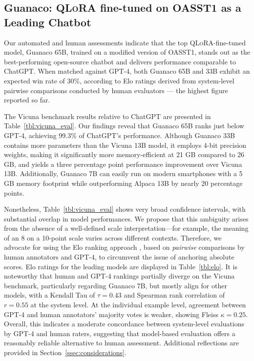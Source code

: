 \subsection{\textbf{Guanaco}: \textsc{QLoRA} fine-tuned on OASST1 as a Leading Chatbot} Our automated and human assessments indicate that the top \textsc{QLoRA}-fine-tuned model, {Guanaco} 65B, trained on a modified version of OASST1, stands out as the best-performing open-source chatbot and delivers performance comparable to ChatGPT. When matched against GPT-4, both {Guanaco} 65B and 33B exhibit an expected win rate of 30\%, according to Elo ratings derived from system-level pairwise comparisons conducted by human evaluators — the highest figure reported so far.

The Vicuna benchmark \cite{vicuna2023} results relative to ChatGPT are presented in Table~\ref{tbl:vicuna_eval}. Our findings reveal that {Guanaco} 65B ranks just below GPT-4, achieving 99.3\% of ChatGPT's performance. Although {Guanaco} 33B contains more parameters than the Vicuna 13B model, it employs 4-bit precision weights, making it significantly more memory-efficient at 21 GB compared to 26 GB, and yields a three percentage point performance improvement over Vicuna 13B. Additionally, {Guanaco} 7B can easily run on modern smartphones with a 5 GB memory footprint while outperforming Alpaca 13B by nearly 20 percentage points.

Nonetheless, Table~\ref{tbl:vicuna_eval} shows very broad confidence intervals, with substantial overlap in model performances. We propose that this ambiguity arises from the absence of a well-defined scale interpretation—for example, the meaning of an 8 on a 10-point scale varies across different contexts. Therefore, we advocate for using the Elo ranking approach \citep{elo1967proposed}, based on \textit{pairwise} comparisons by human annotators and GPT-4, to circumvent the issue of anchoring absolute scores. Elo ratings for the leading models are displayed in Table~\ref{tbl:elo}. It is noteworthy that human and GPT-4 rankings partially diverge on the Vicuna benchmark, particularly regarding Guanaco 7B, but mostly align for other models, with a Kendall Tau of $\tau=0.43$ and Spearman rank correlation of $r=0.55$ at the system level. At the individual example level, agreement between GPT-4 and human annotators' majority votes is weaker, showing Fleiss $\kappa=0.25$. Overall, this indicates a moderate concordance between system-level evaluations by GPT-4 and human raters, suggesting that model-based evaluation offers a reasonably reliable alternative to human assessment. Additional reflections are provided in Section~\ref{ssec:considerations}.

